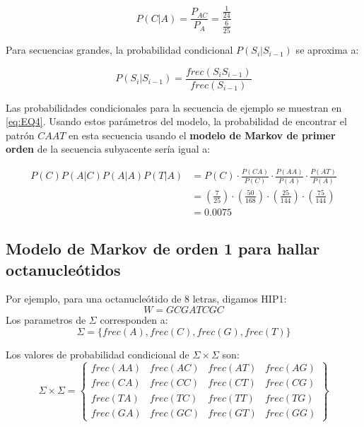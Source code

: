 \documentclass[
]{book}
\begin{document}
\begin{equation}
P(C|A)= \frac{P_{AC}}{P_A}=\frac{\frac{1}{24}}{\frac{6}{25}}
\label{eq:EQ5}
\end{equation}

Para secuencias grandes, la probabilidad condicional \(P(S_i|S_{i-1})\) se aproxima a:

\begin{equation}
P(S_i|S_{i-1}) =\frac{frec(S_iS_{i-1})}{frec(S_{i-1})}
\label{eq:EQ6}
\end{equation}

Las probabilidades condicionales para la secuencia de ejemplo se muestran en \eqref{eq:EQ4}. Usando estos parámetros del modelo, la probabilidad de encontrar el patrón \(CAAT\) en esta secuencia usando el \textbf{modelo de Markov de primer orden} de la secuencia subyacente sería igual a:

\begin{equation}
\begin{split}
P(C)P(A|C)P(A|A)P(T|A) & = P(C)\cdot\frac{P(CA)}{P(C)}\cdot\frac{P(AA)}{P(A)}\cdot\frac{P(AT)}{P(A)} \\
& = (\frac{7}{25}) \cdot (\frac{50}{168}) \cdot (\frac{25}{144}) \cdot (\frac{75}{144})\\
& = 0.0075
\end{split}
\label{eq:EQ7}
\end{equation}

\hypertarget{modelo-de-markov-de-orden-1-para-hallar-octanucleuxf3tidos}{%
\subsection{Modelo de Markov de orden 1 para hallar octanucleótidos}\label{modelo-de-markov-de-orden-1-para-hallar-octanucleuxf3tidos}}

Por ejemplo, para una octanucleótido de 8 letras, digamos HIP1:
\[W=GCGATCGC\]
Los parametros de \(\Sigma\) corresponden a:
\begin{equation}
\Sigma= \{frec(A),frec(C),frec(G),frec(T)\}
\end{equation}

Los valores de probabilidad condicional de \(\Sigma \times \Sigma\) son:
\begin{equation}
\Sigma \times \Sigma = 
\begin{Bmatrix}
  frec(AA) & frec(AC) & frec(AT) & frec(AG) \\ 
  frec(CA) & frec(CC) & frec(CT) & frec(CG) \\
  frec(TA) & frec(TC) & frec(TT) & frec(TG) \\
  frec(GA) & frec(GC) & frec(GT) & frec(GG)
\end{Bmatrix}
\end{equation}
\end{document}
